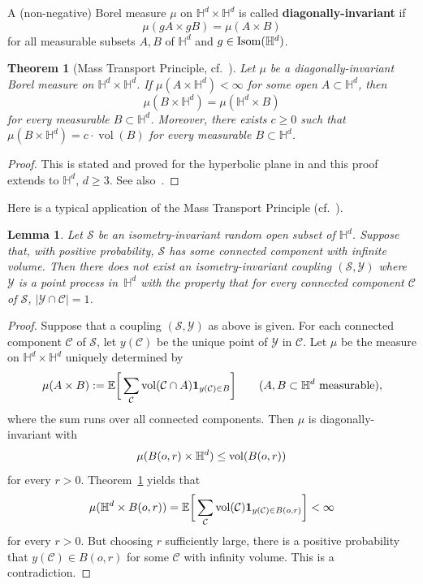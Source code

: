 \documentclass[12pt,a4paper]{article}
\newtheorem{theorem}[proposition]{Theorem}
\newtheorem{lemma}[proposition]{Lemma}
\theoremstyle{definition}
\DeclareMathOperator{\vol}{vol}
\begin{document}
A (non-negative) Borel measure $\mu$ on $\mathbb H^d \times\mathbb H^d$ is called {\bf diagonally-invariant} if
$$
\mu(g A\times g B)=\mu(A\times B)
$$
for all measurable subsets $A,B$ of $\mathbb H^d$ and $g\in{\rm Isom}(\mathbb H^d)$.

\begin{theorem}[Mass Transport Principle, {cf.~\cite{BS01}}] \label{theorem:MTP} Let $\mu$ be a diagonally-invariant Borel measure on $\mathbb H^d\times\mathbb H^d$. If $\mu(A\times\mathbb H^d)<\infty$ for some open $A\subset\mathbb H^d$, then 
$$
\mu(B\times\mathbb H^d)=\mu(\mathbb H^d\times B)
$$
for every measurable $B\subset\mathbb H^d$. Moreover, there exists $c\ge0$ such that $\mu(B\times\mathbb H^d)=c \cdot \vol(B)$ for every measurable $B\subset\mathbb H^d$.
\end{theorem}

\begin{proof}
    This is stated and proved for the hyperbolic plane in \cite[Theorem 5.2]{BS01} and this proof extends to $\mathbb H^d$, $d\ge3$. See also~\cite[Theorem 8.47]{LP16}.
\end{proof}

Here is a typical application of the Mass Transport Principle (cf.~\cite[Example 8.6]{LP16}).

\begin{lemma} \label{lm:ChoosingPoints} Let $\mathcal S$ be an isometry-invariant random open subset of $\mathbb H^d$. Suppose that, with positive probability, $\mathcal S$ has some connected component with infinite volume. Then there does not exist an isometry-invariant coupling $(\mathcal S,\mathcal Y)$ where $\mathcal Y$ is a point process in~$\mathbb H^d$ with the property that for every connected component $\mathcal C$ of $\mathcal S$, $|\mathcal Y\cap \mathcal C|=1$.
\end{lemma}
\begin{proof} Suppose that a coupling $(\mathcal S,\mathcal Y)$ as above is given. For each connected component  $\mathcal C$ of $\mathcal S$,  let $y(\mathcal C)$ be the unique point of $\mathcal Y$ in $\mathcal C$. Let $\mu$ be the measure on $\mathbb H^d\times\mathbb H^d$ uniquely determined by 
$$
\mu(A\times B):= \mathbb E\bigg[ \sum_{\mathcal C} {\rm vol}(\mathcal C \cap A) \mathbf 1_{y(\mathcal C)\in B} \bigg] \qquad (A,B\subset \mathbb H^d \text{ measurable}),
$$
where the sum runs over all connected components. Then $\mu$ is diagonally-invariant with 
$$
\mu(B(o,r)\times\mathbb H^d) \le {\rm vol}(B(o,r))
$$
for every $r>0$. Theorem~\ref{theorem:MTP} yields that 
$$
\mu(\mathbb H^d\times B(o,r)) = \mathbb E\bigg[ \sum_{\mathcal C} {\rm vol}(\mathcal C) \mathbf 1_{y(\mathcal C)\in B(o,r)} \bigg]<\infty
$$
for every $r>0$. But choosing $r$ sufficiently large, there is a positive probability that $y(\mathcal C)\in B(o,r)$ for some $\mathcal C$ with infinity volume. This is a contradiction.
\end{proof}
\end{document}
